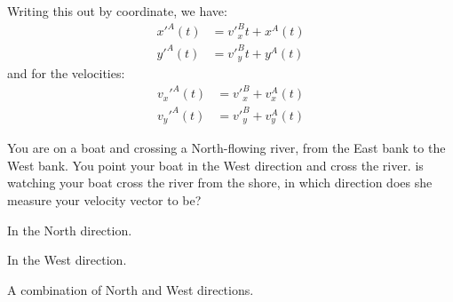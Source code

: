 
Writing this out by coordinate, we have:
\begin{align*}
x'^A(t)&=v'^B_xt+x^A(t)\\
y'^A(t)&=v'^B_yt+y^A(t)
\end{align*}
and for the velocities:
\begin{align*}
v_x'^A(t)&=v'^B_x+v_x^A(t)\\
v_y'^A(t)&=v'^B_y+v_y^A(t)
\end{align*}


\begin{checkpoint}{\begin{MCquestion}{You are on a boat and crossing a North-flowing river, from the East bank to the West bank. You point your boat in the West direction and cross the river. \chloe is watching your boat cross the river from the shore, in which direction does she measure your velocity vector to be?}
\item In the North direction.
\item In the West direction.
\item A combination of North and West directions.
\end{MCquestion}}
\end{checkpoint}


